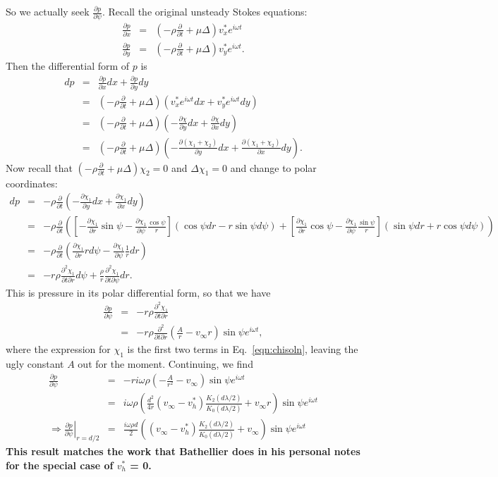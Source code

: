 \documentclass[11pt]{amsart}
\newcommand{\vinf}{v_{\infty}}
\newcommand{\om}{\omega}
\newcommand{\baas}[1]{\begin{eqnarray*} #1 \end{eqnarray*}}
\newcommand{\pd}[2]{\ensuremath{\frac{\partial #1}{\partial #2}}}
\newcommand{\pddd}[3]{\ensuremath{\frac{\partial^2 #1}{\partial #2 \partial #3}}}
\begin{document}
		So we actually seek $\pd{p}{\psi}$. Recall the original unsteady Stokes equations:
		\baas{
		\pd{p}{x} &=& (-\rho\pd{}{t} + \mu \Delta) v_x^*e^{i\om t} \\
		\pd{p}{y} &=& (-\rho\pd{}{t} + \mu \Delta) v_y^*e^{i\om t} .
		}
		Then the differential form of $p$ is
		\baas{
		dp &=& \pd{p}{x}dx + \pd{p}{y}dy \\
		&=& (-\rho \pd{}{t} + \mu \Delta ) (v_x^*e^{i \om t} dx + v_y^* e^{i \om t} dy) \\ 
		&=& (-\rho \pd{}{t} + \mu \Delta ) (-\pd{\chi}{y}dx + \pd{\chi}{x}dy) \\
		&=& (-\rho \pd{}{t} + \mu \Delta ) (-\pd{(\chi_1+\chi_2)}{y}dx + \pd{(\chi_1+\chi_2)}{x}dy).		
		}
		Now recall that $(-\rho \pd{}{t} + \mu \Delta )\chi_2 = 0$ and $\Delta \chi_1 = 0$ and change to polar coordinates:
		\baas{
		dp &=& -\rho \pd{}{t}(-\pd{\chi_1}{y}dx + \pd{\chi_1}{x}dy) \\
		&=& -\rho \pd{}{t} \left( \left[ -\pd{\chi_1}{r}\sin\psi - \pd{\chi_1}{\psi}\frac{\cos\psi}{r}\right]\left( \cos\psi dr -r\sin\psi d\psi \right) + \left[ \pd{\chi_1}{r}\cos\psi - \pd{\chi_1}{\psi}\frac{\sin\psi}{r}\right]\left( \sin\psi dr +r\cos\psi d\psi \right)\right) \\
		&=& -\rho \pd{}{t} \left( \pd{\chi_1}{r}r d\psi - \pd{\chi_1}{\psi}\frac{1}{r} dr\right) \\
		&=& -r\rho \pddd{\chi_1}{t}{r} d\psi + \frac{\rho}{r} \pddd{\chi_1}{t}{\psi} dr.
		}
		This is pressure in its polar differential form, so that we have 
		\baas{
		\pd{p}{\psi} &=& -r\rho \pddd{\chi_1}{t}{r} \\
		&=& -r\rho\pddd{}{t}{r}\left(\frac{A}{r} - \vinf r \right)\sin \psi e^{i \om t},
		}
		where the expression for $\chi_1$ is the first two terms in Eq.~\eqref{eqn:chisoln}, leaving the ugly constant $A$ out for the moment. Continuing, we find
		\baas{
		\pd{p}{\psi} &=& -r i \om \rho \left(-\frac{A}{r^2} - \vinf \right)\sin \psi e^{i \om t} \\
		&=& i \om \rho \left(\frac{d^2}{4r}(\vinf-v_h^*)\frac{K_2(d\lambda/2)}{K_0(d\lambda/2)} + \vinf r \right)\sin \psi e^{i \om t} \\
		\Rightarrow \left . \pd{p}{\psi}\right\vert_{r=d/2} &=& \frac{i \om \rho d}{2}\left((\vinf-v_h^*)\frac{K_2(d\lambda/2)}{K_0(d\lambda/2)} + \vinf \right)\sin \psi e^{i \om t}
		}
		\textbf{This result matches the work that Bathellier does in his personal notes for the special case of $v_h^*$ = 0.}
		
\end{document}
